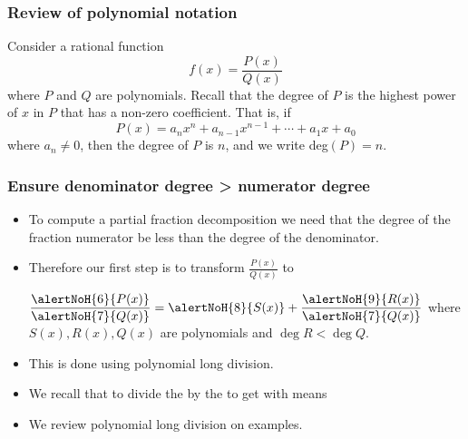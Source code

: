 \begin{frame}
\frametitle{Review of polynomial notation}
Consider a rational function
\[
f(x) = \frac{P(x)}{Q(x)}
\]
where $P$ and $Q$ are polynomials.  Recall that the degree of $P$ is the highest power of $x$ in $P$ that has a non-zero coefficient.  That is, if
\[
P(x) = a_nx^n + a_{n-1}x^{n-1} + \cdots + a_1x + a_0
\]
where $a_n \neq 0$, then the degree of $P$ is $n$, and we write deg$(P) = n$.
\end{frame}
\begin{frame}\frametitle{Ensure denominator degree > numerator degree}
\begin{itemize}
\item To compute a partial fraction decomposition we need that the degree of the fraction numerator be less than the degree of the denominator.
\item<2-> Therefore our first step is to transform $\frac{P(x)}{Q(x)}$ to

$\displaystyle \frac{\alertNoH{6}{P(x)}}{\alertNoH{7}{Q(x)} }= \alertNoH{8}{S(x)}+\frac{\alertNoH{9}{R(x)}}{\alertNoH{7}{Q(x)}} $
where $S(x), R(x), Q(x)$ are polynomials and $\deg R<\deg Q$.
\item<3-> This is done using polynomial long division.
\item<4-> We recall that to divide the  by the  to get  with  means 
\item<10-> We review polynomial long division on examples.
\end{itemize}
\end{frame}

